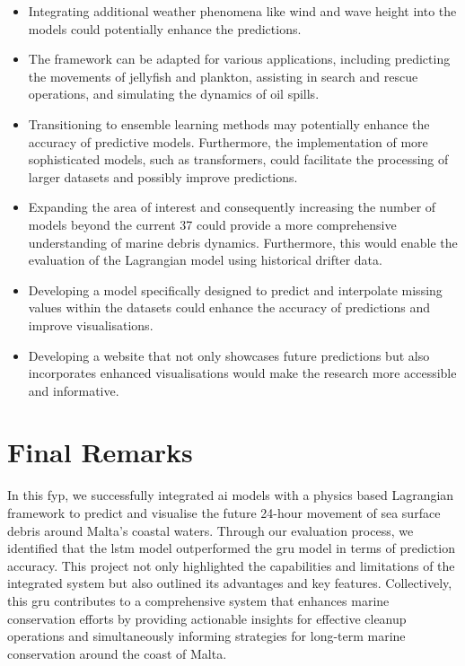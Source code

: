 \begin{itemize}
    \item Integrating additional weather phenomena like wind and wave height into the models could potentially enhance the predictions.
    \item The framework can be adapted for various applications, including predicting the movements of jellyfish and plankton, assisting in search and rescue operations, and simulating the dynamics of oil spills.
    \item Transitioning to ensemble learning methods may potentially enhance the accuracy of predictive models. Furthermore, the implementation of more sophisticated models, such as transformers, could facilitate the processing of larger datasets and possibly improve predictions.
    \item Expanding the area of interest and consequently increasing the number of models beyond the current 37 could provide a more comprehensive understanding of marine debris dynamics. Furthermore, this would enable the evaluation of the Lagrangian model using historical drifter data.
    \item Developing a model specifically designed to predict and interpolate missing values within the datasets could enhance the accuracy of predictions and improve visualisations.
    \item Developing a website that not only showcases future predictions but also incorporates enhanced visualisations would make the research more accessible and informative.
\end{itemize}

\section{Final Remarks}
\label{sec:5.4}

In this \acrshort{fyp}, we successfully integrated \acrshort{ai} models with a physics based Lagrangian framework to predict and visualise the future 24-hour movement of sea surface debris around Malta's coastal waters. Through our evaluation process, we identified that the \acrshort{lstm} model outperformed the \acrshort{gru} model in terms of prediction accuracy. This project not only highlighted the capabilities and limitations of the integrated system but also outlined its advantages and key features. Collectively, this \acrshort{gru} contributes to a comprehensive system that enhances marine conservation efforts by providing actionable insights for effective cleanup operations and simultaneously informing strategies for long-term marine conservation around the coast of Malta.